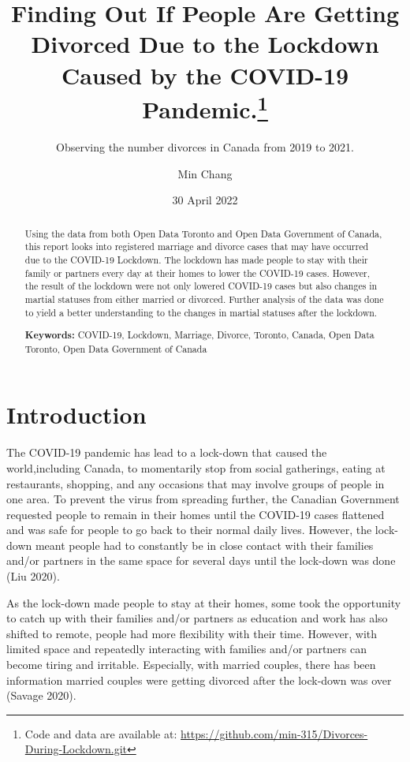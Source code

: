 \documentclass[
]{article}
\title{Finding Out If People Are Getting Divorced Due to the Lockdown Caused by the COVID-19 Pandemic.\thanks{Code and data are available at: \url{https://github.com/min-315/Divorces-During-Lockdown.git}}}
\subtitle{Observing the number divorces in Canada from 2019 to 2021.}
\author{Min Chang}
\date{30 April 2022}
\begin{document}
\maketitle
\begin{abstract}
Using the data from both Open Data Toronto and Open Data Government of Canada, this report looks into registered marriage and divorce cases that may have occurred due to the COVID-19 Lockdown. The lockdown has made people to stay with their family or partners every day at their homes to lower the COVID-19 cases. However, the result of the lockdown were not only lowered COVID-19 cases but also changes in martial statuses from either married or divorced. Further analysis of the data was done to yield a better understanding to the changes in martial statuses after the lockdown.

\par

\textbf{Keywords:} COVID-19, Lockdown, Marriage, Divorce, Toronto, Canada, Open Data Toronto, Open Data Government of Canada
\end{abstract}

\tableofcontents

\hypertarget{introduction}{%
\section{Introduction}\label{introduction}}

The COVID-19 pandemic has lead to a lock-down that caused the world,including Canada, to momentarily stop from social gatherings, eating at restaurants, shopping, and any occasions that may involve groups of people in one area. To prevent the virus from spreading further, the Canadian Government requested people to remain in their homes until the COVID-19 cases flattened and was safe for people to go back to their normal daily lives. However, the lock-down meant people had to constantly be in close contact with their families and/or partners in the same space for several days until the lock-down was done (Liu 2020).

As the lock-down made people to stay at their homes, some took the opportunity to catch up with their families and/or partners as education and work has also shifted to remote, people had more flexibility with their time. However, with limited space and repeatedly interacting with families and/or partners can become tiring and irritable. Especially, with married couples, there has been information married couples were getting divorced after the lock-down was over (Savage 2020).
\end{document}
